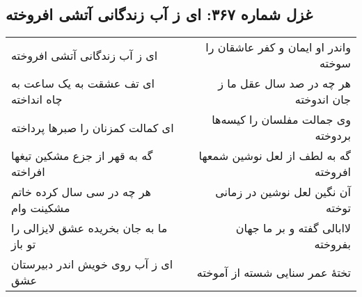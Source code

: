 \begin{center}
\section*{غزل شماره ۳۶۷: ای ز آب زندگانی آتشی افروخته}
\label{sec:367}
\begin{longtable}{l p{0.5cm} r}
ای ز آب زندگانی آتشی افروخته
&&
واندر او ایمان و کفر عاشقان را سوخته
\\
ای تف عشقت به یک ساعت به چاه انداخته
&&
هر چه در صد سال عقل ما ز جان اندوخته
\\
ای کمالت کمزنان را صبرها پرداخته
&&
وی جمالت مفلسان را کیسه‌ها بردوخته
\\
گه به قهر از جزع مشکین تیغها افراخته
&&
گه به لطف از لعل نوشین شمعها افروخته
\\
هر چه در سی سال کرده خاتم مشکینت وام
&&
آن نگین لعل نوشین در زمانی توخته
\\
ما به جان بخریده عشق لایزالی را تو باز
&&
لاابالی گفته و بر ما جهان بفروخته
\\
ای ز آب روی خویش اندر دبیرستان عشق
&&
تختهٔ عمر سنایی شسته از آموخته
\\
\end{longtable}
\end{center}
